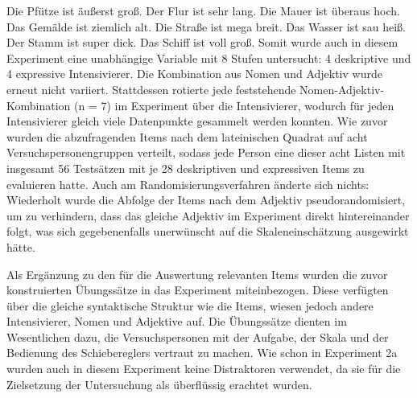 \ea
\ea Die Pfütze ist äußerst groß.
\ex Der Flur ist sehr lang.
\ex Die Mauer ist überaus hoch.
\ex Das Gemälde ist ziemlich alt.
\ex Die Straße ist mega breit.
\ex Das Wasser ist sau heiß.
\ex Der Stamm ist super dick.
\ex Das Schiff ist voll groß.
\z
\z
Somit wurde auch in diesem Experiment eine unabhängige Variable mit 8 Stufen untersucht: 4 deskriptive und 4 expressive Intensivierer. Die Kombination aus Nomen und Adjektiv wurde erneut nicht variiert. Stattdessen rotierte jede feststehende Nomen-Adjektiv-Kombination (n = 7) im Experiment über die Intensivierer, wodurch für jeden Intensivierer gleich viele Datenpunkte gesammelt werden konnten. Wie zuvor wurden die abzufragenden Items nach dem lateinischen Quadrat auf acht Versuchspersonengruppen verteilt, sodass jede Person eine dieser acht Listen mit insgesamt 56 Testsätzen mit je 28 deskriptiven und expressiven Items zu evaluieren hatte. Auch am Randomisierungsverfahren änderte sich nichts: Wiederholt wurde die Abfolge der Items nach dem Adjektiv pseudorandomisiert, um zu verhindern, dass das gleiche Adjektiv im Experiment direkt hintereinander folgt, was sich gegebenenfalls unerwünscht auf die Skaleneinschätzung ausgewirkt hätte.


Als Ergänzung zu den für die Auswertung relevanten Items wurden die zuvor konstruierten Übungssätze in das Experiment miteinbezogen. Diese verfügten über die gleiche syntaktische Struktur wie die Items, wiesen jedoch andere Intensivierer, Nomen und Adjektive auf. Die Übungssätze dienten im Wesentlichen dazu, die Versuchspersonen mit der Aufgabe, der Skala und der Bedienung des Schiebereglers vertraut zu machen. Wie schon in Experiment 2a wurden auch in diesem Experiment keine Distraktoren verwendet, da sie für die Zielsetzung der Untersuchung als überflüssig erachtet wurden.





%



